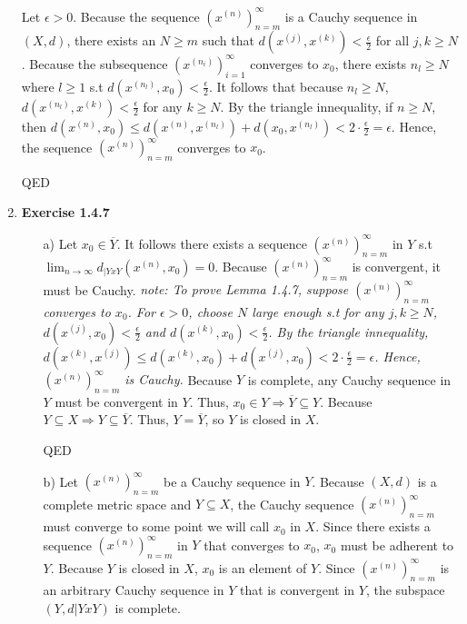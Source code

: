 \documentclass[10pt]{article}
\begin{document}
\begin{enumerate}[label=Problem \arabic*.]
    Let $\epsilon>0$. Because the sequence $(x^{(n)})^{\infty}_{n=m}$ is a Cauchy sequence in $(X,d)$, there exists an $N\ge m$ such that $d(x^{(j)},x^{(k)})<\frac{\epsilon}{2}$ for all $j,k\ge N$. 
    Because the subsequence $(x^{(n_i)})^{\infty}_{i=1}$ converges to $x_0$, there exists $n_l\ge N$ where $l\ge 1$ s.t $d(x^{(n_l)},x_0)<\frac{\epsilon}{2}$. 
    It follows that because $n_l\ge N$, $d(x^{(n_l)},x^{(k)})<\frac{\epsilon}{2}$ for any $k\ge N$. 
    By the triangle innequality, if $n\ge N$, then $d(x^{(n)},x_0)\le d(x^{(n)},x^{(n_l)})+d(x_0,x^{(n_l)})< 2\cdot \frac{\epsilon}{2}=\epsilon$. 
    Hence, the sequence $(x^{(n)})^{\infty}_{n=m}$ converges to $x_0$.\par 
    QED
    \item \textbf{Exercise 1.4.7} \par
    \begin{itemize}
        \item [a)] Let $x_0\in \overline{Y}$. 
        It follows there exists a sequence $(x^{(n)})_{n=m}^{\infty}$ in $Y$ s.t $\displaystyle{\lim_{n\rightarrow \infty}}d_{|YxY}(x^{(n)},x_0)=0$. 
        Because $(x^{(n)})_{n=m}^{\infty}$ is convergent, it must be Cauchy.
        \textit{note: To prove Lemma 1.4.7, suppose $(x^{(n)})_{n=m}^{\infty}$ converges to $x_0$. 
        For $\epsilon>0$, choose $N$ large enough s.t for any $j,k\ge N$, $d(x^{(j)},x_0)<\frac{\epsilon}{2}$ and $d(x^{(k)},x_0)<\frac{\epsilon}{2}$. 
        By the triangle innequality, $d(x^{(k)},x^{(j)})\le d(x^{(k)},x_0)+d(x^{(j)},x_0)<2\cdot \frac{\epsilon}{2}=\epsilon$.
        Hence, $(x^{(n)})_{n=m}^{\infty}$ is Cauchy.} 
        Because $Y$ is complete, any Cauchy sequence in $Y$ must be convergent in $Y$. 
        Thus, $x_0\in Y\Rightarrow \overline{Y}\subseteq Y$.
        Because $Y\subseteq X\Rightarrow Y\subseteq \overline{Y}$. 
        Thus, $Y=\overline{Y}$, so $Y$ is closed in $X$.\par 
        QED
        \item [b)] Let $(x^{(n)})_{n=m}^{\infty}$ be a Cauchy sequence in $Y$. 
        Because $(X,d)$ is a complete metric space and $Y\subseteq X$, the Cauchy sequence $(x^{(n)})_{n=m}^{\infty}$ must converge to some point we will call $x_0$ in $X$. 
        Since there exists a sequence $(x^{(n)})_{n=m}^{\infty}$ in $Y$ that converges to $x_0$, $x_0$ must be adherent to $Y$. 
        Because $Y$ is closed in $X$, $x_0$ is an element of $Y$. 
        Since $(x^{(n)})_{n=m}^{\infty}$ is an arbitrary Cauchy sequence in $Y$ that is convergent in $Y$, the subspace $(Y,d|YxY)$ is complete.\par

\end{itemize}
\end{enumerate}
\end{document}
